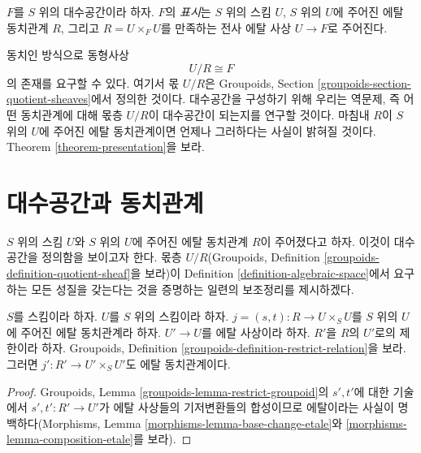 \begin{definition}
\label{definition-presentation}
$F$를 $S$ 위의 대수공간이라 하자.
$F$의 {\it 표시}는 $S$ 위의 스킴 $U$, $S$ 위의 $U$에 주어진
에탈 동치관계 $R$, 그리고 $R = U \times_F U$를 만족하는 전사 에탈
사상 $U \to F$로 주어진다.
\end{definition}

\noindent
동치인 방식으로 동형사상
$$
U/R \cong F
$$
의 존재를 요구할 수 있다. 여기서 몫 $U/R$은 Groupoids, Section
\ref{groupoids-section-quotient-sheaves}에서 정의한 것이다.
대수공간을 구성하기 위해 우리는 역문제, 즉 어떤 동치관계에 대해
몫층 $U/R$이 대수공간이 되는지를 연구할 것이다. 마침내 $R$이
$S$ 위의 $U$에 주어진 에탈 동치관계이면 언제나 그러하다는 사실이
밝혀질 것이다. Theorem \ref{theorem-presentation}을 보라.













\section{대수공간과 동치관계}
\label{section-spaces-from-equivalence-relations}

\noindent
$S$ 위의 스킴 $U$와 $S$ 위의 $U$에 주어진 에탈 동치관계 $R$이
주어졌다고 하자. 이것이 대수공간을 정의함을 보이고자 한다.
몫층 $U/R$(Groupoids, Definition
\ref{groupoids-definition-quotient-sheaf}을 보라)이 Definition
\ref{definition-algebraic-space}에서 요구하는 모든 성질을 갖는다는
것을 증명하는 일련의 보조정리를 제시하겠다.

\begin{lemma}
\label{lemma-pullback-etale-equivalence-relation}
$S$를 스킴이라 하자. $U$를 $S$ 위의 스킴이라 하자.
$j = (s, t) : R \to U \times_S U$를 $S$ 위의 $U$에 주어진 에탈
동치관계라 하자. $U' \to U$를 에탈 사상이라 하자.
$R'$을 $R$의 $U'$로의 제한이라 하자. Groupoids, Definition
\ref{groupoids-definition-restrict-relation}을 보라.
그러면 $j' : R' \to U' \times_S U'$도 에탈 동치관계이다.
\end{lemma}

\begin{proof}
Groupoids, Lemma \ref{groupoids-lemma-restrict-groupoid}의
$s', t'$에 대한 기술에서 $s' , t' : R' \to U'$가 에탈 사상들의
기저변환들의 합성이므로 에탈이라는 사실이 명백하다(Morphisms, Lemma
\ref{morphisms-lemma-base-change-etale}와
\ref{morphisms-lemma-composition-etale}를 보라).
\end{proof}

